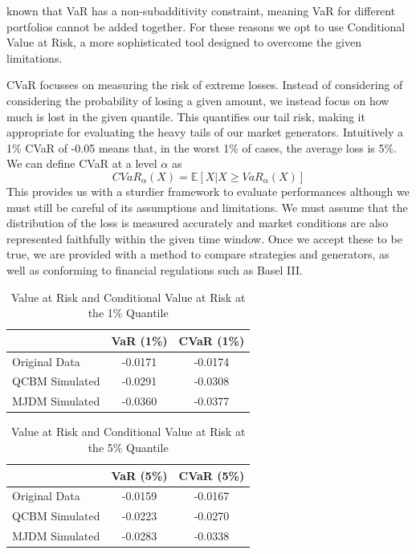 \documentclass[12pt]{article}
\newcommand{\newp}
    {
    \vskip 0.5cm 
  }
\numberwithin{equation}{section}
\begin{document}
known that VaR has a non-subadditivity constraint, meaning VaR for different portfolios 
cannot be added together. For these reasons we opt to use Conditional Value at 
Risk, a more sophisticated tool designed to overcome the given limitations. 
\newp 
CVaR focusses on measuring the risk of extreme losses. Instead of considering of 
considering the probability of losing a given amount, we instead focus on how 
much is lost in the given quantile. This quantifies our tail risk, making it 
appropriate for evaluating the heavy tails of our market generators. Intuitively 
a 1\% CVaR of -0.05 means that, in the worst 1\% of cases, the average loss is 5\%. 
We can define CVaR at a level $\alpha$ as 
\begin{equation}
  CVaR_{\alpha}(X) = \mathbb{E}[X | X \geq VaR_{\alpha}(X)]
\end{equation}
This provides us with a sturdier framework to evaluate performances although we 
must still be careful of its assumptions and limitations. We must assume that the 
distribution of the loss is measured accurately and market conditions are also 
represented faithfully within the given time window. Once we accept these to be 
true, we are provided with a method to compare strategies and generators, as well 
as conforming to financial regulations such as Basel III.
\newp 

\begin{table}[h!]
\centering
\begin{tabular}{lcc}
\hline
\textbf{} & \textbf{VaR (1\%)} & \textbf{CVaR (1\%)} \\
\hline
Original Data     & -0.0171 & -0.0174 \\
QCBM Simulated    & -0.0291 & -0.0308 \\
MJDM Simulated    & -0.0360 & -0.0377 \\
\hline
\end{tabular}
\caption{Value at Risk and Conditional Value at Risk at the 1\% Quantile}
\label{tab:var_cvar_1}
\end{table}
\begin{table}[h!]
\centering
\begin{tabular}{lcc}
\hline
\textbf{} & \textbf{VaR (5\%)} & \textbf{CVaR (5\%)} \\
\hline
Original Data     & -0.0159 & -0.0167 \\
QCBM Simulated    & -0.0223 & -0.0270 \\
MJDM Simulated    & -0.0283 & -0.0338 \\
\hline
\end{tabular}
\caption{Value at Risk and Conditional Value at Risk at the 5\% Quantile}
\label{tab:var_cvar_5}
\end{table}
\end{document}

